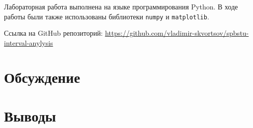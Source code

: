 \documentclass{article}
\begin{document}
  Лабораторная работа выполнена на языке программирования Python. В ходе
  работы были также использованы библиотеки \verb!numpy! и
  \verb!matplotlib!.

  Ссылка на GitHub репозиторий:
  \href{https://github.com/vladimir-skvortsov/spbstu-interval-anylysis}{https://github.com/vladimir-skvortsov/spbstu-interval-anylysis}



  \clearpage

  \section{Обсуждение}

  \section{Выводы}
\end{document}

